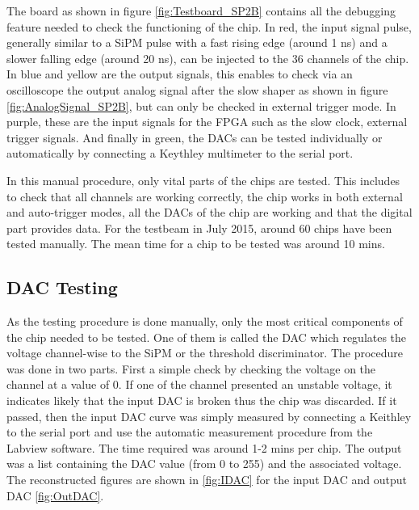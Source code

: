 The board as shown in figure \ref{fig:Testboard_SP2B} contains all the debugging feature needed to check the functioning of the chip. In red, the input signal pulse, generally similar to a SiPM pulse with a fast rising edge (around 1 ns) and a slower falling edge (around 20 ns), can be injected to the 36 channels of the chip. In blue and yellow are the output signals, this enables to check via an oscilloscope the output analog signal after the slow shaper as shown in figure \ref{fig:AnalogSignal_SP2B}, but can only be checked in external trigger mode. In purple, these are the input signals for the FPGA such as the slow clock, external trigger signals. And finally in green, the DACs can be tested individually or automatically by connecting a Keythley multimeter to the serial port.

In this manual procedure, only vital parts of the chips are tested. This includes to check that all channels are working correctly, the chip works in both external and auto-trigger modes, all the DACs of the chip are working and that the digital part provides data. For the testbeam in July 2015, around 60 chips have been tested manually. The mean time for a chip to be tested was around 10 mins.

\subsection{DAC Testing}

As the testing procedure is done manually, only the most critical components of the chip needed to be tested. One of them is called the DAC which regulates the voltage channel-wise to the SiPM or the threshold discriminator. The procedure was done in two parts. First a simple check by checking the voltage on the channel at a value of 0. If one of the channel presented an unstable voltage, it indicates likely that the input DAC is broken thus the chip was discarded. If it passed, then the input DAC curve was simply measured by connecting a Keithley to the serial port and use the automatic measurement procedure from the Labview software. The time required was around 1-2 mins per chip. The output was a list containing the DAC value (from 0 to 255) and the associated voltage. The reconstructed figures are shown in \ref{fig:IDAC} for the input DAC and output DAC \ref{fig:OutDAC}.

